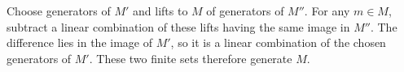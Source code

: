 Choose generators of $M'$ and lifts to $M$ of generators of $M''$. For any $m\in M$, subtract a linear combination of these lifts having the same image in $M''$. The difference lies in the image of $M'$, so it is a linear combination of the chosen generators of $M'$. These two finite sets therefore generate $M$.
